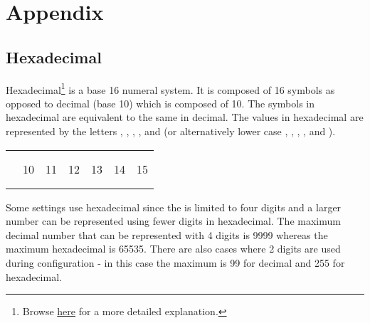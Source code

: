 \part{Appendix}

\chapter{Hexadecimal} \label{Hexadecimal}

Hexadecimal\footnote{Browse \href{https://en.wikipedia.org/wiki/Hexadecimal}{here}
for a more detailed explanation.} is a base \num{16} numeral system.  It is
composed of \num{16} symbols as opposed to decimal (base \num{10}) which is
composed of \num{10}. The symbols  in hexadecimal are equivalent to
the same in decimal.  The values  in hexadecimal are represented by
the letters , , , ,  and  (or
alternatively lower case , , , ,  and
).

\begin{table}[H]
  \begin{tabu}{ X[3,l,m] X[1,c,m] X[1,c,m] X[1,c,m] X[1,c,m] X[1,c,m] X[1,c,m] }
    \thrule
     \\ \mdrule

      & 
      & 
      & 
      & 
      & 
      & 
    \\ \mrule
      & \num{10}
      & \num{11}
      & \num{12}
      & \num{13}
      & \num{14}
      & \num{15}
    \\ \mrule
      & 
      & 
      & 
      & 
      & 
      & 
    \\ \mrule
  \end{tabu}
\end{table}

Some settings use hexadecimal since the  is limited to four digits
and a larger number can be represented using fewer digits in hexadecimal. The
maximum decimal number that can be represented with \num{4} digits is
\num{9999} whereas the maximum hexadecimal is \num{65535}.  There are also
cases where \num{2} digits are used during configuration - in this case the
maximum is \num{99} for decimal and \num{255} for hexadecimal.

